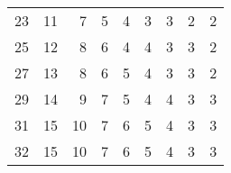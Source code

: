 \begin{table}[h]
\begin{tabular}{|r|rrrrrrrr}
23                                                & \cellcolor[HTML]{EF9D78}11 & \cellcolor[HTML]{F6BC91}7                        & \cellcolor[HTML]{F9CB9C}5                        & \cellcolor[HTML]{FBD8B5}4                        & \cellcolor[HTML]{FCE5CE}3                        & \cellcolor[HTML]{FCE5CE}3                        & \cellcolor[HTML]{FEF2E7}2                        & \cellcolor[HTML]{FEF2E7}2 \\ \cline{1-1}
25                                                & \cellcolor[HTML]{ED9573}12 & \cellcolor[HTML]{F4B48A}8                        & \cellcolor[HTML]{F8C496}6                        & \cellcolor[HTML]{FBD8B5}4                        & \cellcolor[HTML]{FBD8B5}4                        & \cellcolor[HTML]{FCE5CE}3                        & \cellcolor[HTML]{FCE5CE}3                        & \cellcolor[HTML]{FEF2E7}2 \\ \cline{1-1}
27                                                & \cellcolor[HTML]{EC8D6C}13 & \cellcolor[HTML]{F4B48A}8                        & \cellcolor[HTML]{F8C496}6                        & \cellcolor[HTML]{F9CB9C}5                        & \cellcolor[HTML]{FBD8B5}4                        & \cellcolor[HTML]{FCE5CE}3                        & \cellcolor[HTML]{FCE5CE}3                        & \cellcolor[HTML]{FEF2E7}2 \\ \cline{1-1}
29                                                & \cellcolor[HTML]{EA8566}14 & \cellcolor[HTML]{F3AC85}9                        & \cellcolor[HTML]{F6BC91}7                        & \cellcolor[HTML]{F9CB9C}5                        & \cellcolor[HTML]{FBD8B5}4                        & \cellcolor[HTML]{FBD8B5}4                        & \cellcolor[HTML]{FCE5CE}3                        & \cellcolor[HTML]{FCE5CE}3 \\ \cline{1-1}
31                                                & \cellcolor[HTML]{E87D61}15 & \cellcolor[HTML]{F1A47F}10                       & \cellcolor[HTML]{F6BC91}7                        & \cellcolor[HTML]{F8C496}6                        & \cellcolor[HTML]{F9CB9C}5                        & \cellcolor[HTML]{FBD8B5}4                        & \cellcolor[HTML]{FCE5CE}3                        & \cellcolor[HTML]{FCE5CE}3 \\ \cline{1-1}
32                                                & \cellcolor[HTML]{E87D61}15 & \cellcolor[HTML]{F1A47F}10                       & \cellcolor[HTML]{F6BC91}7                        & \cellcolor[HTML]{F8C496}6                        & \cellcolor[HTML]{F9CB9C}5                        & \cellcolor[HTML]{FBD8B5}4                        & \cellcolor[HTML]{FCE5CE}3                        & \cellcolor[HTML]{FCE5CE}3 \\ \cline{1-1}

\end{tabular}
\end{table}
